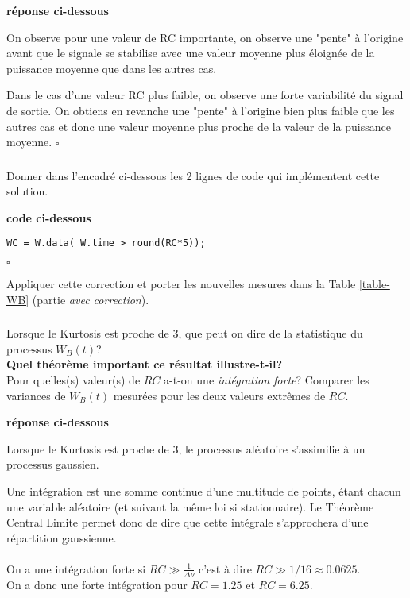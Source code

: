 \documentclass{article}
\newcommand{\debutrep}[1]{\color{blue}\begin{center} \hrulefill \textbf{ #1 } \hrulefill \end{center} }
\newcommand{\finrep}{\vspace*{5mm}\hfill $\square$\color{black}\vspace*{5mm}}
\begin{document}
\debutrep{réponse ci-dessous}
On observe pour une valeur de RC importante, on observe une "pente" à l'origine avant que le signale se stabilise avec une valeur moyenne plus éloignée de la puissance moyenne que dans les autres cas.

Dans le cas d'une valeur RC plus faible, on observe une forte variabilité du signal de sortie. On obtiens en revanche une "pente" à l'origine bien plus faible que les autres cas et donc une valeur moyenne plus proche de la valeur de la puissance moyenne.
\finrep

\subsubsection{}
Donner dans l'encadré ci-dessous les 2 lignes de code qui implémentent cette solution.

\debutrep{code ci-dessous}
\begin{verbatim}
WC = W.data( W.time > round(RC*5));
\end{verbatim}
\finrep

Appliquer cette correction et porter les nouvelles mesures dans la Table \ref{table-WB} (partie {\em avec correction}).


\subsubsection{}
Lorsque le Kurtosis est proche de $3$, que peut on dire de la statistique du processus $W_B(t)$? \\
\textbf{Quel théorème important ce résultat illustre-t-il?}\\
 Pour quelles(s) valeur(s) de $RC$ a-t-on une {\em intégration forte}?  Comparer les variances de $W_B(t)$ mesurées pour les deux valeurs extrêmes de $RC$. 

\debutrep{réponse ci-dessous}
Lorsque le Kurtosis est proche de 3, le processus aléatoire s'assimilie à un processus gaussien.

Une intégration est une somme continue d'une multitude de points, étant chacun une variable aléatoire (et suivant la même loi si stationnaire).
Le Théorème Central Limite permet donc de dire que cette intégrale s'approchera d'une répartition gaussienne.\\
\\
On a une intégration forte si $RC \gg \frac{1}{\Delta\nu}$ c'est à dire $RC \gg 1/16 \approx 0.0625$. \\
On a donc une forte intégration pour $RC = 1.25$ et  $RC = 6.25$.\\
\\
\end{document}
